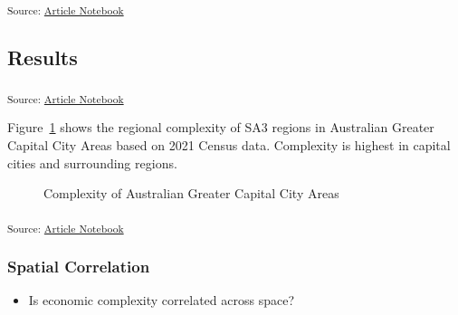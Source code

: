 \documentclass[
]{agujournal2019}
\providecommand{\tightlist}{%
  \setlength{\itemsep}{0pt}\setlength{\parskip}{0pt}}\usepackage{longtable,booktabs,array}
\begin{document}
\textsubscript{Source:
\href{https://aiti-flinders.github.io/sirp-complexity/index.qmd.html}{Article
Notebook}}

\subsection{Results}\label{results}

\textsubscript{Source:
\href{https://aiti-flinders.github.io/sirp-complexity/index.qmd.html}{Article
Notebook}}

Figure~\ref{fig-gcc-complexity} shows the regional complexity of SA3
regions in Australian Greater Capital City Areas based on 2021 Census
data. Complexity is highest in capital cities and surrounding regions.

\label{cell-fig-gcc-complexity}
\begin{figure}[H]


\caption{\label{fig-gcc-complexity}Complexity of Australian Greater
Capital City Areas}

\end{figure}%

\textsubscript{Source:
\href{https://aiti-flinders.github.io/sirp-complexity/index.qmd.html}{Article
Notebook}}

\subsubsection{Spatial Correlation}\label{spatial-correlation}

\begin{itemize}
\tightlist
\item
  Is economic complexity correlated across space?
\end{itemize}
\end{document}
